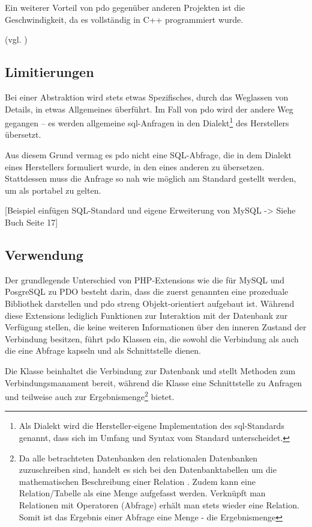Ein weiterer Vorteil von \gls{pdo} gegenüber anderen Projekten ist die Geschwindigkeit, da es vollständig in C++ programmiert wurde.

(vgl. \cite[S. 5]{book:popel2007pdo})

\subsection{Limitierungen}
Bei einer Abstraktion wird stets etwas Spezifisches, durch das Weglassen von Details, in etwas Allgemeines überführt. Im Fall von \gls{pdo} wird der andere Weg gegangen – es werden allgemeine \gls{sql}-Anfragen in den Dialekt\footnote{Als Dialekt wird die Hersteller-eigene Implementation des \gls{sql}-Standards genannt, dass sich im Umfang und Syntax vom Standard unterscheidet.} des Herstellers übersetzt.

Aus diesem Grund vermag es \gls{pdo} nicht eine SQL-Abfrage, die in dem Dialekt eines Herstellers formuliert wurde, in den eines anderen zu übersetzen. Stattdessen muss die Anfrage so nah wie möglich am Standard gestellt werden, um als portabel zu gelten.

[Beispiel einfügen SQL-Standard und eigene Erweiterung von MySQL -> Siehe Buch Seite 17]

\subsection{Verwendung}
Der grundlegende Unterschied von PHP-Extensions wie die für MySQL und PosgreSQL zu PDO besteht darin, dass die zuerst genannten eine prozeduale Bibliothek darstellen und \gls{pdo} streng Objekt-orientiert aufgebaut ist. Während diese Extensions lediglich Funktionen zur Interaktion mit der Datenbank zur Verfügung stellen, die keine weiteren Informationen über den inneren Zustand der Verbindung besitzen, führt \gls{pdo} Klassen ein, die sowohl die Verbindung als auch die eine Abfrage kapseln und als Schnittstelle dienen.

Die Klasse  beinhaltet die Verbindung zur Datenbank und stellt Methoden zum Verbindungsmanament bereit, während die Klasse  eine Schnittstelle zu Anfragen und teilweise auch zur Ergebnismenge\footnote{Da alle betrachteten Datenbanken den relationalen Datenbanken zuzuschreiben sind, handelt es sich bei den Datenbanktabellen um die mathematischen Beschreibung einer Relation . Zudem kann eine Relation/Tabelle als eine Menge aufgefasst werden. Verknüpft man Relationen mit Operatoren (Abfrage) erhält man stets wieder eine Relation. Somit ist das Ergebnis einer Abfrage eine Menge - die Ergebnismenge} bietet.%

